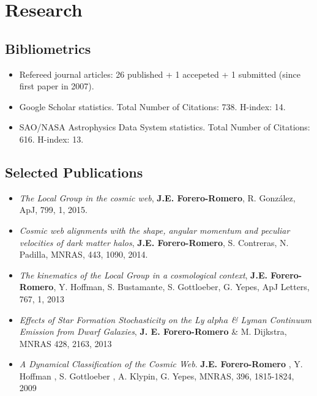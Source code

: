 \documentclass[a4paper,10pt]{article} %
\begin{document}
\color{red}
\section{Research}
\color{black}

\subsection{Bibliometrics}
\begin{itemize}
\item Refereed journal articles:  26 published + 1 accepeted + 1 submitted (since
  first paper in 2007).
\item Google Scholar statistics. Total Number of Citations: 738. H-index: 14.
\item SAO/NASA Astrophysics Data System statistics. Total Number of Citations: 616. H-index: 13.
\end{itemize}
\subsection{Selected Publications}
\begin{itemize}


\item
{\it The Local Group in the cosmic web}, {\bf
  J.E. Forero-Romero}, R. Gonz\'alez, ApJ, 799, 1, 2015.

\item 
{\it Cosmic web alignments with the shape, angular momentum
  and peculiar velocities of dark matter halos}, 
  {\bf J.E. Forero-Romero}, S. Contreras, N. Padilla, MNRAS, 443,
  1090, 2014. 

\item {\it The kinematics of the Local Group in a cosmological context}, 
{\bf J.E. Forero-Romero}, Y. Hoffman, S. Bustamante, S. Gottloeber,
G. Yepes, ApJ Letters, 767, 1, 2013 

\item {\it Effects of Star Formation Stochasticity on the Ly
  $alpha$ \& Lyman Continuum Emission from Dwarf Galaxies}, {\bf
  J. E. Forero-Romero} \& M. Dijkstra, MNRAS 428, 2163, 2013 

\item 
{\it A Dynamical Classification of the  Cosmic Web}.  {\bf J.E. Forero-Romero} , Y. Hoffman ,  S. Gottloeber , A. Klypin, G. Yepes,
MNRAS, 396, 1815-1824, 2009
\end{itemize}

\end{document}
